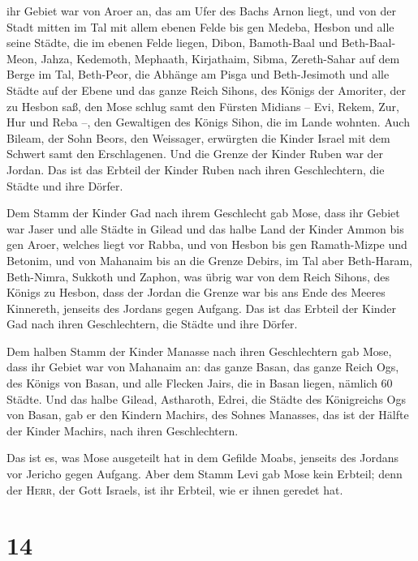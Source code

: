 ihr Gebiet war von Aroer an, das am Ufer des Bachs Arnon liegt, und von
der Stadt mitten im Tal mit allem ebenen Felde bis gen Medeba,
 Hesbon und alle seine Städte, die im ebenen Felde
liegen, Dibon, Bamoth-Baal und Beth-Baal-Meon,  Jahza,
Kedemoth, Mephaath,  Kirjathaim, Sibma, Zereth-Sahar auf
dem Berge im Tal,  Beth-Peor, die Abhänge am Pisga und
Beth-Jesimoth  und alle Städte auf der Ebene und das
ganze Reich Sihons, des Königs der Amoriter, der zu Hesbon saß, den Mose
schlug samt den Fürsten Midians -- Evi, Rekem, Zur, Hur und Reba --, den
Gewaltigen des Königs Sihon, die im Lande wohnten.  Auch
Bileam, der Sohn Beors, den Weissager, erwürgten die Kinder Israel mit
dem Schwert samt den Erschlagenen.  Und die Grenze der
Kinder Ruben war der Jordan. Das ist das Erbteil der Kinder Ruben nach
ihren Geschlechtern, die Städte und ihre Dörfer.

 Dem Stamm der Kinder Gad nach ihrem Geschlecht gab Mose,
 dass ihr Gebiet war Jaser und alle Städte in Gilead und
das halbe Land der Kinder Ammon bis gen Aroer, welches liegt vor Rabba,
 und von Hesbon bis gen Ramath-Mizpe und Betonim, und von
Mahanaim bis an die Grenze Debirs,  im Tal aber
Beth-Haram, Beth-Nimra, Sukkoth und Zaphon, was übrig war von dem Reich
Sihons, des Königs zu Hesbon, dass der Jordan die Grenze war bis ans
Ende des Meeres Kinnereth, jenseits des Jordans gegen Aufgang.
 Das ist das Erbteil der Kinder Gad nach ihren
Geschlechtern, die Städte und ihre Dörfer.

 Dem halben Stamm der Kinder Manasse nach ihren
Geschlechtern gab Mose,  dass ihr Gebiet war von Mahanaim
an: das ganze Basan, das ganze Reich Ogs, des Königs von Basan, und alle
Flecken Jairs, die in Basan liegen, nämlich 60 Städte. 
Und das halbe Gilead, Astharoth, Edrei, die Städte des Königreichs Ogs
von Basan, gab er den Kindern Machirs, des Sohnes Manasses, das ist der
Hälfte der Kinder Machirs, nach ihren Geschlechtern.

 Das ist es, was Mose ausgeteilt hat in dem Gefilde
Moabs, jenseits des Jordans vor Jericho gegen Aufgang. 
Aber dem Stamm Levi gab Mose kein Erbteil; denn der \textsc{Herr}, der
Gott Israels, ist ihr Erbteil, wie er ihnen geredet hat.

\hypertarget{section-13}{%
\section{14}\label{section-13}}

